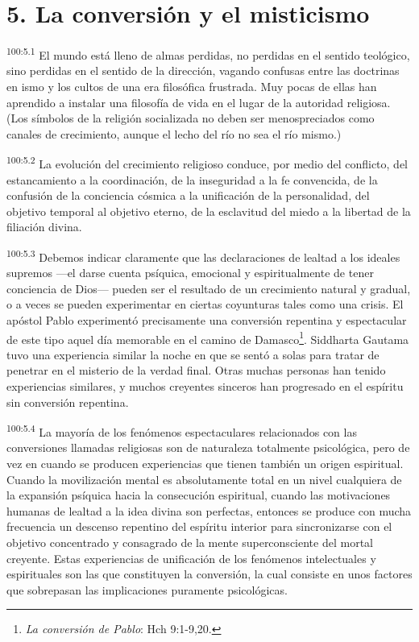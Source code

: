 \section*{5. La conversión y el misticismo}
\par
\textsuperscript{100:5.1} El mundo está lleno de almas perdidas, no perdidas en el sentido teológico, sino perdidas en el sentido de la dirección, vagando confusas entre las doctrinas en ismo y los cultos de una era filosófica frustrada. Muy pocas de ellas han aprendido a instalar una filosofía de vida en el lugar de la autoridad religiosa. (Los símbolos de la religión socializada no deben ser menospreciados como canales de crecimiento, aunque el lecho del río no sea el río mismo.)

\par
\textsuperscript{100:5.2} La evolución del crecimiento religioso conduce, por medio del conflicto, del estancamiento a la coordinación, de la inseguridad a la fe convencida, de la confusión de la conciencia cósmica a la unificación de la personalidad, del objetivo temporal al objetivo eterno, de la esclavitud del miedo a la libertad de la filiación divina.

\par
\textsuperscript{100:5.3} Debemos indicar claramente que las declaraciones de lealtad a los ideales supremos ---el darse cuenta psíquica, emocional y espiritualmente de tener conciencia de Dios--- pueden ser el resultado de un crecimiento natural y gradual, o a veces se pueden experimentar en ciertas coyunturas tales como una crisis. El apóstol Pablo experimentó precisamente una conversión repentina y espectacular de este tipo aquel día memorable en el camino de Damasco\footnote{\textit{La conversión de Pablo}: Hch 9:1-9,20.}. Siddharta Gautama tuvo una experiencia similar la noche en que se sentó a solas para tratar de penetrar en el misterio de la verdad final. Otras muchas personas han tenido experiencias similares, y muchos creyentes sinceros han progresado en el espíritu sin conversión repentina.

\par
\textsuperscript{100:5.4} La mayoría de los fenómenos espectaculares relacionados con las conversiones llamadas religiosas son de naturaleza totalmente psicológica, pero de vez en cuando se producen experiencias que tienen también un origen espiritual. Cuando la movilización mental es absolutamente total en un nivel cualquiera de la expansión psíquica hacia la consecución espiritual, cuando las motivaciones humanas de lealtad a la idea divina son perfectas, entonces se produce con mucha frecuencia un descenso repentino del espíritu interior para sincronizarse con el objetivo concentrado y consagrado de la mente superconsciente del mortal creyente. Estas experiencias de unificación de los fenómenos intelectuales y espirituales son las que constituyen la conversión, la cual consiste en unos factores que sobrepasan las implicaciones puramente psicológicas.

